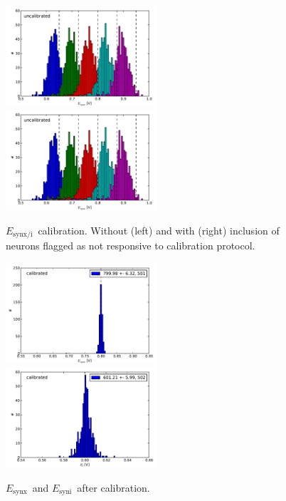 \documentclass[12pt,a4paper,bibliography=totocnumbered,listof=totocnumbered, DIV12]{scrartcl}
\newcommand{\esyn}{\ensuremath{E_{\text{synx/i}}}}
\newcommand{\esynx}{\ensuremath{E_{\text{synx}}}}
\newcommand{\esyni}{\ensuremath{E_{\text{syni}}}}
\begin{document}
\begin{figure}
  \centering
  \includegraphics[width=0.5\textwidth]{figures/E_synx_uncalibrated_without_defects}%
  \includegraphics[width=0.5\textwidth]{figures/E_synx_uncalibrated_with_defects}
  \caption{\esyn\ calibration. Without (left) and with (right) inclusion of neurons flagged as not responsive to calibration protocol.}
  \label{fig:esyn_before_calibration}
\end{figure}

\begin{figure}
  \centering
  \includegraphics[width=0.5\textwidth]{figures/E_synx_calibrated_without_defects}%
  \includegraphics[width=0.5\textwidth]{figures/E_syni_calibrated_without_defects}
  \caption{\esynx\ and \esyni\ after calibration.}
  \label{fig:esyn_after_calibration}
\end{figure}
\end{document}
